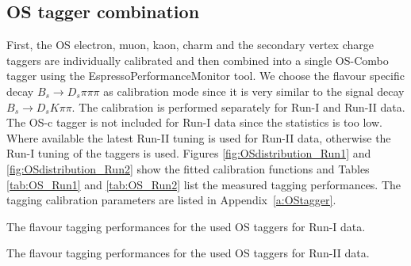 \clearpage
\subsection{OS tagger combination}
\label{subsec: OScalibration}

First, the OS electron, muon, kaon, charm and the secondary vertex charge taggers are individually calibrated and then combined into a single 
OS-Combo tagger using the \textsf{EspressoPerformanceMonitor} tool.
We choose the flavour specific decay  $B_s \to D_s \pi\pi\pi$ as calibration mode since it is very similar to the signal decay $B_s \to D_s K\pi\pi$.
The calibration is performed separately for Run-I and Run-II data.
The OS-c tagger is not included for Run-I data since the statistics is too low.
Where available the latest Run-II tuning is used for Run-II data, otherwise the Run-I tuning of the taggers is used.
Figures \ref{fig:OSdistribution_Run1} and \ref{fig:OSdistribution_Run2} show the fitted calibration functions
and Tables \ref{tab:OS_Run1} and \ref{tab:OS_Run2} list the measured tagging performances.
The tagging calibration parameters are listed in Appendix~\ref{a:OStagger}.

\begin{table}[h]
\centering
\caption{The flavour tagging performances for the used OS taggers for Run-I data.}
\resizebox{\linewidth}{!}{
	
}
\label{tab:OS_Run1}
%
\caption{The flavour tagging performances for the used OS taggers for Run-II data.}
\resizebox{\linewidth}{!}{
	
}
\label{tab:OS_Run2}
\end{table}

